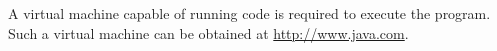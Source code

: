 A virtual machine capable of running  code is required to execute the program.
Such a virtual machine can be obtained at \url{http://www.java.com}.

